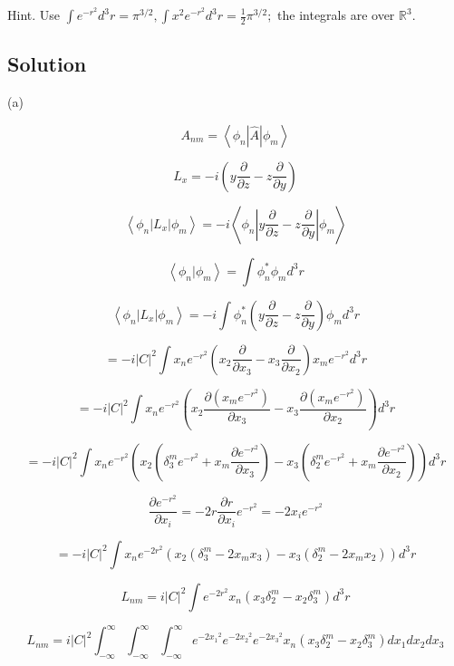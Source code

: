 \documentclass[12pt]{article}
\begin{document}
Hint. Use \(\int e^{-r^2} d^3 r=\pi^{3 / 2}, \int x^2 e^{-r^2} d^3 r=\frac{1}{2} \pi^{3 / 2} ;\) the integrals are over \(\mathbb{R}^3\).

\subsection{Solution}

(a)

\[
    A_{n m}=\left\langle\phi_n|\hat{A}| \phi_m\right\rangle
\]

\[
    L_x = -i\left(y \frac{\partial}{\partial z}-z \frac{\partial}{\partial y}\right)
\]

\[
    \left\langle\phi_n|L_x| \phi_m\right\rangle
    = -i\left\langle\phi_n\left|y \frac{\partial}{\partial z}-z \frac{\partial}{\partial y}\right| \phi_m\right\rangle
\]

\[
    \left\langle\phi_n|\phi_m\right\rangle = \int \phi_n^* \phi_m d^3 r
\]

\[
    \left\langle\phi_n|L_x| \phi_m\right\rangle
    = -i\int \phi_n^* \left(y \frac{\partial}{\partial z}-z \frac{\partial}{\partial y}\right) \phi_m d^3 r
\]

\[
    = -i{\left\lvert C\right\rvert}^2 \int x_n e^{-r^2} \left(x_2 \frac{\partial}{\partial x_3}-x_3 \frac{\partial}{\partial x_2}\right) x_m e^{-r^2} d^3 r
\]

\[
    = -i{\left\lvert C\right\rvert}^2 \int x_n e^{-r^2} \left(x_2 \frac{\partial \left(x_m e^{-r^2}\right) }{\partial x_3}-x_3 \frac{\partial \left(x_m e^{-r^2}\right) }{\partial x_2}\right) d^3 r
\]

\[
    = -i{\left\lvert C\right\rvert}^2 \int x_n e^{-r^2} \left(x_2 \left(\delta^m_3 e^{-r^2} + x_m \frac{\partial e^{-r^2}}{\partial x_3}\right) - x_3 \left(\delta^m_2 e^{-r^2} + x_m \frac{\partial e^{-r^2}}{\partial x_2}\right)\right) d^3 r
\]

\[
    \frac{\partial e^{-r^2}}{\partial x_i} = -2 r \frac{\partial r}{\partial x_i} e^{-r^2}
    = -2 x_i e^{-r^2}
\]

\[
    = -i{\left\lvert C\right\rvert}^2 \int x_n e^{-2r^2} \left(x_2 \left(\delta^m_3 - 2 x_m x_3\right) - x_3 \left(\delta^m_2 - 2 x_m x_2\right)\right) d^3 r
\]

\[
    L_{nm} = i{\left\lvert C\right\rvert}^2 \int e^{-2r^2} x_n \left(x_3 \delta^m_2 - x_2 \delta^m_3\right)  d^3 r
\]

\[
    L_{nm} = i{\left\lvert C\right\rvert}^2
    \int_{-\infty }^{\infty}
    \int_{-\infty}^{\infty}
    \int_{-\infty}^{\infty}
    e^{-2{x_1}^2}e^{-2{x_2}^2}e^{-2{x_3}^2}
    x_n \left(x_3 \delta^m_2 - x_2 \delta^m_3\right)  d{x_1} d{x_2} d{x_3}
\]
\end{document}
